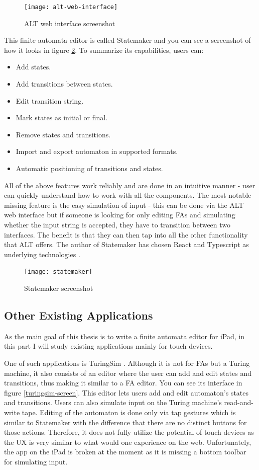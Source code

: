 \begin{figure}
    \texttt{[image: alt-web-interface]}
    \caption{ALT web interface screenshot}\label{alt-web-interface-screen}
\end{figure}

This finite automata editor is called Statemaker and you can see a screenshot of how it looks in figure \ref{statemaker-screen}. To summarize its capabilities, users can:
\begin{itemize}
    \item Add states.
    \item Add transitions between states.
    \item Edit transition string.
    \item Mark states as initial or final.
    \item Remove states and transitions.
    \item Import and export automaton in supported formats.
    \item Automatic positioning of transitions and states.
\end{itemize}
All of the above features work reliably and are done in an intuitive manner - user can quickly understand how to work with all the components. The most notable missing feature is the easy simulation of input - this can be done via the ALT web interface but if someone is looking for only editing FAs and simulating whether the input string is accepted, they have to transition between two interfaces. The benefit is that they can then tap into all the other functionality that ALT offers. The author of Statemaker has chosen React and Typescript as underlying technologies \cite{state-maker}.

\begin{figure}
    \texttt{[image: statemaker]}
    \caption{Statemaker screenshot}\label{statemaker-screen}
\end{figure}

\subsection{Other Existing Applications}

As the main goal of this thesis is to write a finite automata editor for iPad, in this part I will study existing applications mainly for touch devices. 

One of such applications is TuringSim \cite{turingsim}. Although it is not for FAs but a Turing machine, it also consists of an editor where the user can add and edit states and transitions, thus making it similar to a FA editor. You can see its interface in figure \ref{turingsim-screen}. This editor lets users add and edit automaton's states and transitions. Users can also simulate input on the Turing machine's read-and-write tape. Editing of the automaton is done only via tap gestures which is similar to Statemaker with the difference that there are no distinct buttons for those actions. Therefore, it does not fully utilize the potential of touch devices as the UX is very similar to what would one experience on the web. Unfortunately, the app on the iPad is broken at the moment as it is missing a bottom toolbar for simulating input.

